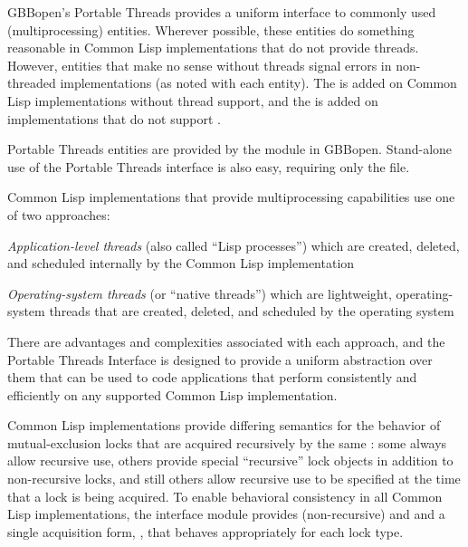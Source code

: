 
%
%
GBBopen's Portable Threads provides a uniform interface to commonly used
 (multiprocessing) entities.  Wherever possible, these entities
do something reasonable in Common Lisp implementations that do not provide
threads. However, entities that make no sense without threads signal errors in
non-threaded implementations (as noted with each entity).  The 
 is added on Common Lisp implementations
without thread support, and the 
 is added on implementations that do
not support .

Portable Threads entities are provided by the 
module in GBBopen.  Stand-alone use of the Portable Threads interface is also
easy, requiring only the
file.


Common Lisp implementations that provide multiprocessing capabilities use one
of two approaches:
\begin{tightitemize}
\item \textit{Application-level threads\/} (also called ``Lisp processes'') which are
  created, deleted, and scheduled internally by the Common Lisp implementation
\item \textit{Operating-system threads\/} (or ``native threads'') which are
  lightweight, operating-system threads that are created, deleted, and
  scheduled by the operating system
\end{tightitemize}

There are advantages and complexities associated with each approach, and the
Portable Threads Interface is designed to provide a uniform abstraction over
them that can be used to code applications that perform consistently and
efficiently on any supported Common Lisp implementation.


Common Lisp implementations provide differing semantics for the behavior of
mutual-exclusion locks that are acquired recursively by the same
: some always allow recursive use, others provide special
``recursive'' lock objects in addition to non-recursive locks, and still
others allow recursive use to be specified at the time that a lock is being
acquired.  To enable behavioral consistency in all Common Lisp
implementations, the  interface module provides
(non-recursive)  and  and a single
acquisition form, , that behaves
appropriately for each lock type.


